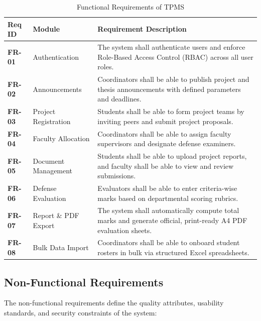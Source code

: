 \documentclass[12pt,a4paper]{report}
\begin{document}
\begin{table}[H]
\centering
\caption{Functional Requirements of TPMS}
\label{tab:fr}
\vspace{4pt}
\small
\begin{tabularx}{\textwidth}{@{}l p{3.2cm} X@{}}
\toprule
\textbf{Req ID} & \textbf{Module} & \textbf{Requirement Description} \\
\midrule
\textbf{FR-01} & Authentication & The system shall authenticate users and enforce Role-Based Access Control (RBAC) across all user roles. \\

\textbf{FR-02} & Announcements & Coordinators shall be able to publish project and thesis announcements with defined parameters and deadlines. \\

\textbf{FR-03} & Project Registration & Students shall be able to form project teams by inviting peers and submit project proposals. \\

\textbf{FR-04} & Faculty Allocation & Coordinators shall be able to assign faculty supervisors and designate defense examiners. \\

\textbf{FR-05} & Document Management & Students shall be able to upload project reports, and faculty shall be able to view and review submissions. \\

\textbf{FR-06} & Defense Evaluation & Evaluators shall be able to enter criteria-wise marks based on departmental scoring rubrics. \\

\textbf{FR-07} & Report \& PDF Export & The system shall automatically compute total marks and generate official, print-ready A4 PDF evaluation sheets. \\

\textbf{FR-08} & Bulk Data Import & Coordinators shall be able to onboard student rosters in bulk via structured Excel spreadsheets. \\
\bottomrule
\end{tabularx}
\end{table}

\subsection{Non-Functional Requirements}
The non-functional requirements define the quality attributes, usability standards, and security constraints of the system:
\end{document}
